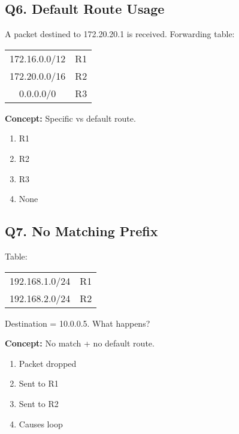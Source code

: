 
\subsection*{Q6. Default Route Usage}
A packet destined to 172.20.20.1 is received.
Forwarding table:

\begin{table}[H]
\centering
\begin{tabular}{|c|c|}
\hline
172.16.0.0/12 & R1 \\
172.20.0.0/16 & R2 \\
0.0.0.0/0 & R3 \\
\hline
\end{tabular}
\end{table}

\textbf{Concept:} Specific vs default route.

\begin{enumerate}[label=(\alph*)]
\item R1 \quad \item R2 \quad \item R3 \quad \item None
\end{enumerate}


\subsection*{Q7. No Matching Prefix}
Table:

\begin{table}[H]
\centering
\begin{tabular}{|c|c|}
\hline
192.168.1.0/24 & R1 \\
192.168.2.0/24 & R2 \\
\hline
\end{tabular}
\end{table}

Destination = 10.0.0.5. What happens?

\textbf{Concept:} No match + no default route.

\begin{enumerate}[label=(\alph*)]
\item Packet dropped  
\item Sent to R1  
\item Sent to R2  
\item Causes loop
\end{enumerate}


